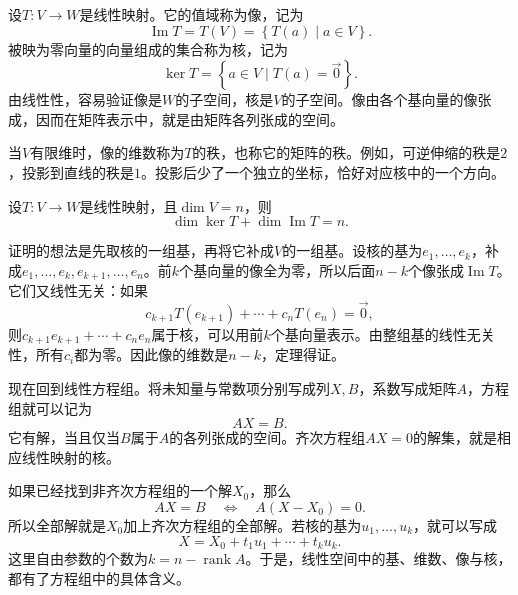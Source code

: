 设\(T : V \longrightarrow W\)是线性映射。它的值域称为{\heiti{}像}，记为
\begin{equation}
    \operatorname{Im} T = T \left( V \right) = \left\{ T \left( a \right) \mid a \in V \right\} .
\end{equation}
被映为零向量的向量组成的集合称为{\heiti{}核}，记为
\begin{equation}
    \ker T = \left\{ a \in V \mid T \left( a \right) = \vec{0} \right\} .
\end{equation}
由线性性，容易验证像是\(W\)的子空间，核是\(V\)的子空间。像由各个基向量的像张成，因而在矩阵表示中，就是由矩阵各列张成的空间。

当\(V\)有限维时，像的维数称为\(T\)的{\heiti{}秩}，也称它的矩阵的秩。例如，可逆伸缩的秩是\(2\)，投影到直线的秩是\(1\)。投影后少了一个独立的坐标，恰好对应核中的一个方向。

\begin{theorem}\label{thm:rank-nullity}
设\(T : V \longrightarrow W\)是线性映射，且\(\dim V = n\)，则
\begin{equation}
    \dim \ker T + \dim \operatorname{Im} T = n .
\end{equation}
\end{theorem}

证明的想法是先取核的一组基，再将它补成\(V\)的一组基。设核的基为\(e_{1} , \ldots , e_{k}\)，补成\(e_{1} , \ldots , e_{k} , e_{k + 1} , \ldots , e_{n}\)。前\(k\)个基向量的像全为零，所以后面\(n - k\)个像张成\(\operatorname{Im} T\)。它们又线性无关：如果
\begin{equation}
    c_{k + 1} T \left( e_{k + 1} \right) + \cdots + c_{n} T \left( e_{n} \right) = \vec{0} ,
\end{equation}
则\(c_{k + 1} e_{k + 1} + \cdots + c_{n} e_{n}\)属于核，可以用前\(k\)个基向量表示。由整组基的线性无关性，所有\(c_{i}\)都为零。因此像的维数是\(n - k\)，定理得证。

现在回到线性方程组。将未知量与常数项分别写成列\(X , B\)，系数写成矩阵\(A\)，方程组就可以记为
\begin{equation}
    A X = B .
\end{equation}
它有解，当且仅当\(B\)属于\(A\)的各列张成的空间。齐次方程组\(A X = 0\)的解集，就是相应线性映射的核。

如果已经找到非齐次方程组的一个解\(X_{0}\)，那么
\begin{equation}
    A X = B \quad \Longleftrightarrow \quad A \left( X - X_{0} \right) = 0 .
\end{equation}
所以全部解就是\(X_{0}\)加上齐次方程组的全部解。若核的基为\(u_{1} , \ldots , u_{k}\)，就可以写成
\begin{equation}
    X = X_{0} + t_{1} u_{1} + \cdots + t_{k} u_{k} .
\end{equation}
这里自由参数的个数为\(k = n - \operatorname{rank} A\)。于是，线性空间中的基、维数、像与核，都有了方程组中的具体含义。

